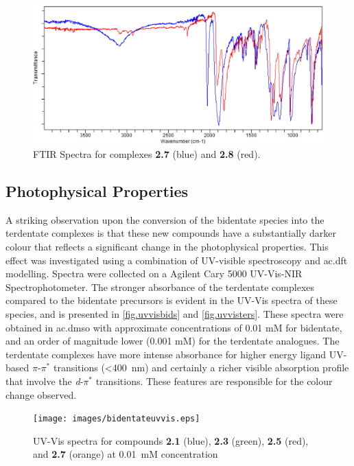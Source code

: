 \begin{figure}[!htb]
 \centering
 \includegraphics[clip=true, width=\textwidth, keepaspectratio]{images/ftir7and8.eps}
 \caption[FTIR Spectra for complexes \textbf{2.7} and \textbf{2.8}]{FTIR Spectra for complexes \textbf{2.7} (blue) and \textbf{2.8} (red).}
 \label{fig.ir78}
\end{figure}

\FloatBarrier
\subsection{Photophysical Properties}

A striking observation upon the conversion of the bidentate species into the terdentate complexes is that these new compounds have a substantially darker colour that reflects a significant change in the photophysical properties. This effect was investigated using a combination of UV-visible spectroscopy and \gls{ac.dft} modelling. Spectra were collected on a Agilent Cary 5000 UV-Vis-NIR Spectrophotometer. The stronger absorbance of the terdentate complexes compared to the bidentate precursors is evident in the UV-Vis spectra of these species, and is presented in \autoref{fig.uvvisbids} and \autoref{fig.uvvisters}. These spectra were obtained in \gls{ac.dmso} with approximate concentrations of 0.01 mM for bidentate, and an order of magnitude lower (0.001 mM) for the terdentate analogues. The terdentate complexes have more intense absorbance for higher energy ligand UV-based $\pi$-$\pi^\ast$ transitions (\textless 400~nm) and certainly a richer visible absorption profile that involve the \textit{d}-$\pi^\ast$ transitions. These features are responsible for the colour change observed.

\begin{figure}[!htb]
\centering
 \texttt{[image: images/bidentateuvvis.eps]}
 \caption[UV-Vis spectra for compounds \textbf{2.1}, \textbf{2.3}, \textbf{2.5}, and \textbf{2.7}]{UV-Vis spectra for compounds \textbf{2.1} (blue), \textbf{2.3} (green), \textbf{2.5} (red), and \textbf{2.7} (orange) at 0.01~mM concentration}
 \label{fig.uvvisbids}
\end{figure}

